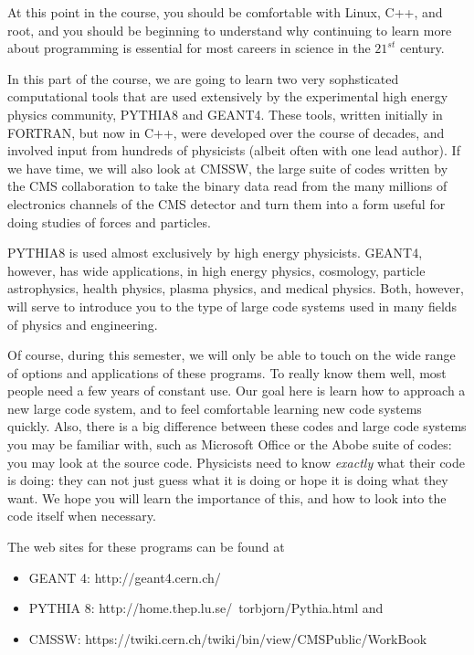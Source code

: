 At this point in the course, you should be comfortable with
Linux, C++, and root, and you should be beginning to understand
why continuing to learn more about programming is essential for most
careers in science in the ${21^{st}}$ century.

In this part of the course, we are going to learn two very sophsticated
computational tools that are used extensively by the experimental
high energy physics community, PYTHIA8 and GEANT4.
These tools, written initially in FORTRAN, but now in C++,
were developed over
the course of decades, and involved input from hundreds of
physicists (albeit often with one lead author).  
If we have time, we will also look at CMSSW, the large suite of
codes written by the CMS collaboration to take the binary data
read from the many millions of electronics channels of the CMS 
detector and turn them into a form useful for doing studies
of forces and particles.

PYTHIA8 is used almost exclusively by high energy physicists.
GEANT4, however, has wide applications, in high energy physics,
cosmology,
particle astrophysics, health physics, plasma physics, and medical physics.
Both, however, will serve to introduce you to the type of
large code systems used in many fields of physics and engineering.

Of course, during this semester, we will only be able to touch
on the wide range of options and applications of these programs.
To really know them well, most people need a few years of constant
use.  Our goal here is learn how to approach a new large code system,
and to feel comfortable learning new code systems quickly.
Also, there is a big difference between these codes and 
large code systems you may be familiar with, such as Microsoft Office
or the Abobe suite of codes: you may look at the source code.  Physicists need to know {\it exactly} what their code is doing: they can not just guess what it is doing or hope it is doing what they want.  We hope you will learn
the importance of this, and how to look into the code itself when
necessary.

The web sites for these programs can be found at
\begin{itemize}
\item GEANT 4: http://geant4.cern.ch/
\item PYTHIA 8:  http://home.thep.lu.se/~torbjorn/Pythia.html  and   
\item CMSSW: https://twiki.cern.ch/twiki/bin/view/CMSPublic/WorkBook
\end{itemize}
